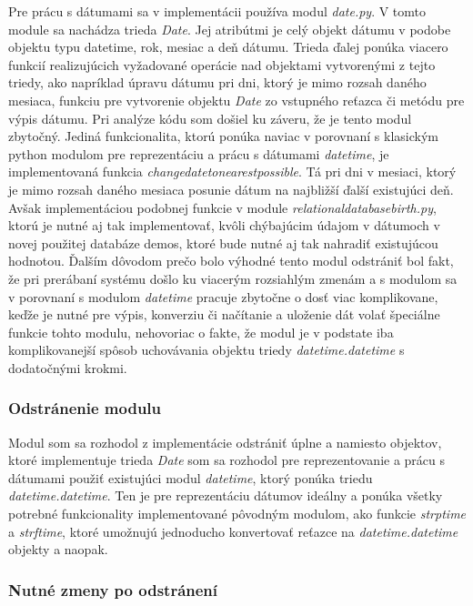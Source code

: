 Pre prácu s dátumami sa v implementácii používa modul \textit{date.py}. V tomto module sa nachádza trieda \textit{Date}. Jej atribútmi je celý objekt dátumu v podobe objektu typu datetime, rok, mesiac a deň dátumu. Trieda ďalej ponúka viacero funkcií realizujúcich vyžadované operácie nad objektami vytvorenými z tejto triedy, ako napríklad úpravu dátumu pri dni, ktorý je mimo rozsah daného mesiaca, funkciu pre vytvorenie objektu \textit{Date} zo vstupného reťazca či metódu pre výpis dátumu. Pri analýze kódu som došiel ku záveru, že je tento modul zbytočný. Jediná funkcionalita, ktorú ponúka naviac v porovnaní s klasickým python modulom pre reprezentáciu a prácu s dátumami \textit{datetime}, je implementovaná funkcia \textit{change\textunderscore date\textunderscore to\textunderscore nearest\textunderscore possible}. Tá pri dni v mesiaci, ktorý je mimo rozsah daného mesiaca posunie dátum na najbližší ďalší existujúci deň. Avšak implementáciou podobnej funkcie v module \textit{relational\textunderscore database\textunderscore birth.py}, ktorú je nutné aj tak implementovať, kvôli chýbajúcim údajom v dátumoch v novej použitej databáze demos, ktoré bude nutné aj tak nahradiť existujúcou hodnotou. Ďalším dôvodom prečo bolo výhodné tento modul odstrániť bol fakt, že pri prerábaní systému došlo ku viacerým rozsiahlým zmenám a s modulom sa v porovnaní s modulom \textit{datetime} pracuje zbytočne o dosť viac komplikovane, keďže je nutné pre výpis, konverziu či načítanie a uloženie dát volať špeciálne funkcie tohto modulu, nehovoriac o fakte, že modul je v podstate iba komplikovanejší spôsob uchovávania objektu triedy \textit{datetime.datetime} s dodatočnými krokmi.

\subsubsection{Odstránenie modulu}

Modul som sa rozhodol z implementácie odstrániť úplne a namiesto objektov, ktoré implementuje trieda \textit{Date} som sa rozhodol pre reprezentovanie a prácu s dátumami použiť existujúci modul \textit{datetime}, ktorý ponúka triedu \textit{datetime.datetime}. Ten je pre reprezentáciu dátumov ideálny a ponúka všetky potrebné funkcionality implementované pôvodným modulom, ako funkcie \textit{strptime} a \textit{strftime}, ktoré umožnujú jednoducho konvertovať reťazce na \textit{datetime.datetime} objekty a naopak.

\subsubsection{Nutné zmeny po odstránení}

